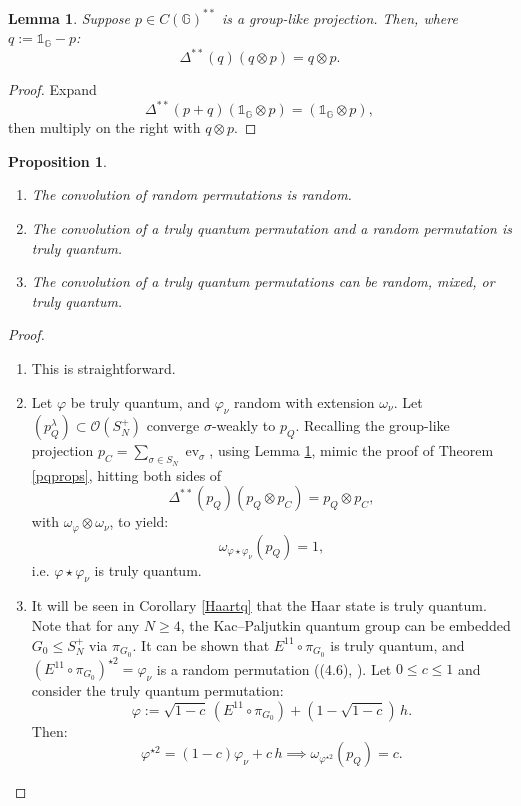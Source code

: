 \documentclass[12pt]{amsart}
\newtheorem{proposition}[theorem]{Proposition}
\newtheorem{lemma}[theorem]{Lemma}
\theoremstyle{remark}
\theoremstyle{remark}
\begin{document}
\begin{lemma}\label{qlemma}
Suppose $p\in C(\mathbb{G})^{**}$ is a group-like projection. Then, where $q:=\mathds{1}_{\mathbb{G}}-p$:
$$\Delta^{**}(q)(q\otimes p)=q\otimes p.$$
\end{lemma}
\begin{proof}
  Expand
  $$\Delta^{**}(p+q)(\mathds{1}_{\mathbb{G}}\otimes p)=(\mathds{1}_{\mathbb{G}}\otimes p),$$
  then multiply on the right with $q\otimes p$.
\end{proof}
\begin{proposition}\label{rules}
\begin{enumerate}
  \item[(i)] The convolution of random permutations is random.
  \item[(ii)] The convolution of a truly quantum permutation and a random permutation is truly quantum.
  \item[(iii)] The convolution of a truly quantum permutations can be random, mixed, or truly quantum.
\end{enumerate}
\end{proposition}
\begin{proof}
  \begin{enumerate}
    \item[(i)] This is straightforward.
    \item[(ii)] Let $\varphi$ be truly quantum, and $\varphi_\nu$ random with extension $\omega_\nu$. Let $(p_Q^\lambda)\subset \mathcal{O}(S_N^+)$ converge $\sigma$-weakly to $p_Q$. Recalling the group-like projection $p_C=\sum_{\sigma\in S_N}\operatorname{ev}_\sigma$,  using Lemma \ref{qlemma}, mimic the proof of Theorem \ref{pqprops}, hitting both sides of
        $$\Delta^{**}(p_Q)(p_Q\otimes p_C)=p_Q\otimes p_C,$$
        with $\omega_\varphi\otimes \omega_\nu$, to yield:
        $$\omega_{\varphi\star \varphi_\nu}(p_Q)=1,$$
        i.e. $\varphi\star \varphi_\nu$ is truly quantum.
    \item[(iii)] It will be seen in Corollary \ref{Haartq} that the Haar state is truly quantum. Note that for any $N\geq 4$, the Kac--Paljutkin quantum group can be embedded $G_0\leq S_N^+$ via $\pi_{G_0}$. It can be shown that   $E^{11}\circ \pi_{G_0}$ is truly quantum, and  $(E^{11}\circ \pi_{G_0})^{\star 2}=\varphi_\nu$ is a random permutation ((4.6), \cite{mcc}). Let $0\leq c\leq 1$ and consider the truly quantum permutation:
$$\varphi:=\sqrt{1-c}\,(E^{11}\circ \pi_{G_0})+(1-\sqrt{1-c})\,h.$$
Then:
$$\varphi^{\star 2}=(1-c)\varphi_\nu+c \,h\implies \omega_{\varphi^{\star 2}}(p_Q)=c.$$
  \end{enumerate}
\end{proof}
\end{document}
